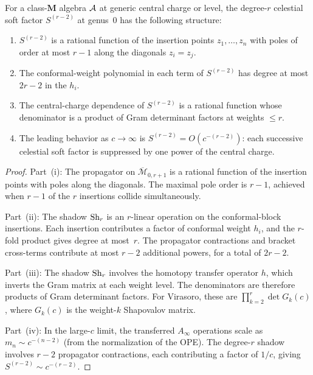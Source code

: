 \begin{proposition}
\label{prop:thqg-VI-polynomial-growth}
For a class-$\mathbf{M}$ algebra $\mathcal{A}$ at generic central charge
or level, the degree-$r$ celestial soft factor $S^{(r-2)}$ at genus~$0$ has
the following structure:
\begin{enumerate}[label=\textup{(\roman*)}]
\item $S^{(r-2)}$ is a rational function of the insertion
 points $z_1, \dotsc, z_n$ with poles of order at most $r-1$
 along the diagonals $z_i = z_j$.
\item The conformal-weight polynomial in each term of $S^{(r-2)}$
 has degree at most $2r - 2$ in the $h_i$.
\item The central-charge dependence of $S^{(r-2)}$ is a rational
 function whose denominator is a product of Gram determinant
 factors at weights $\leq r$.
\item The leading behavior as $c \to \infty$ is
 $S^{(r-2)} = O(c^{-(r-2)})$: each successive celestial soft factor is
 suppressed by one power of the central charge.
\end{enumerate}
\end{proposition}

\begin{proof}
Part~(i): The propagator on $\overline{\mathcal{M}}_{0,r+1}$
is a rational function of the insertion points with poles along
the diagonals. The maximal pole order is $r-1$, achieved when
$r-1$ of the $r$ insertions collide simultaneously.

Part~(ii): The shadow $\operatorname{Sh}_r$ is an $r$-linear operation on the
conformal-block insertions. Each insertion contributes a factor
of conformal weight $h_i$, and the $r$-fold product gives
degree at most~$r$. The propagator contractions and bracket
cross-terms contribute at most $r - 2$ additional powers, for
a total of $2r - 2$.

Part~(iii): The shadow $\operatorname{Sh}_r$ involves the homotopy transfer
operator $h$, which inverts the Gram matrix at each weight
level. The denominators are therefore products of Gram
determinant factors. For Virasoro, these are
$\prod_{k=2}^{r} \det G_k(c)$, where $G_k(c)$ is the
weight-$k$ Shapovalov matrix.

Part~(iv): In the large-$c$ limit, the transferred
$A_\infty$ operations scale as $m_n \sim c^{-(n-2)}$ (from
the normalization of the OPE). The degree-$r$ shadow involves
$r-2$ propagator contractions, each contributing a factor of
$1/c$, giving $S^{(r-2)} \sim c^{-(r-2)}$.
\end{proof}

